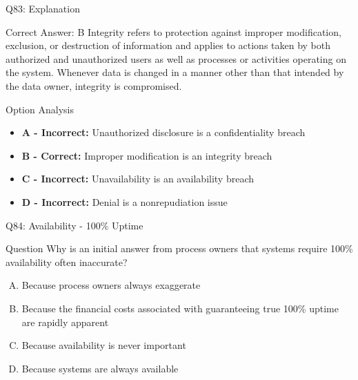 \documentclass{beamer}
\begin{document}
	\begin{frame}{Q83: Explanation}
		\begin{block}{Correct Answer: B}
			Integrity refers to protection against improper modification, exclusion, or destruction of information and applies to actions taken by both authorized and unauthorized users as well as processes or activities operating on the system. Whenever data is changed in a manner other than that intended by the data owner, integrity is compromised.
		\end{block}
		\begin{block}{Option Analysis}
			\begin{itemize}
				\item \textbf{A - Incorrect:} Unauthorized disclosure is a confidentiality breach
				\item \textbf{B - Correct:} Improper modification is an integrity breach
				\item \textbf{C - Incorrect:} Unavailability is an availability breach
				\item \textbf{D - Incorrect:} Denial is a nonrepudiation issue
			\end{itemize}
		\end{block}
	\end{frame}
	
	\begin{frame}{Q84: Availability - 100\% Uptime}
		\begin{block}{Question}
			Why is an initial answer from process owners that systems require 100\% availability often inaccurate?
		\end{block}
		\begin{enumerate}[(A)]
			\item Because process owners always exaggerate
			\item Because the financial costs associated with guaranteeing true 100\% uptime are rapidly apparent
			\item Because availability is never important
			\item Because systems are always available
		\end{enumerate}
	\end{frame}
	
\end{document}
